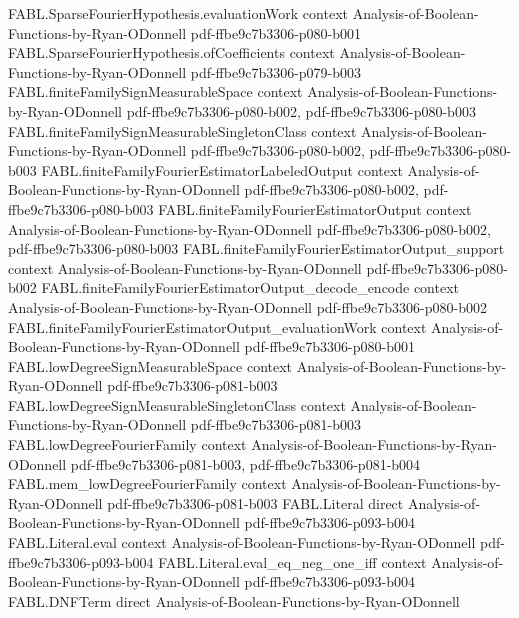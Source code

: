 \begin{theorem}
\proofstep
  {FABL.SparseFourierHypothesis.evaluationWork}
  {context}
  {Analysis-of-Boolean-Functions-by-Ryan-ODonnell}
  {pdf-ffbe9c7b3306-p080-b001}
\proofstep
  {FABL.SparseFourierHypothesis.ofCoefficients}
  {context}
  {Analysis-of-Boolean-Functions-by-Ryan-ODonnell}
  {pdf-ffbe9c7b3306-p079-b003}
\proofstep
  {FABL.finiteFamilySignMeasurableSpace}
  {context}
  {Analysis-of-Boolean-Functions-by-Ryan-ODonnell}
  {pdf-ffbe9c7b3306-p080-b002,
    pdf-ffbe9c7b3306-p080-b003}
\proofstep
  {FABL.finiteFamilySignMeasurableSingletonClass}
  {context}
  {Analysis-of-Boolean-Functions-by-Ryan-ODonnell}
  {pdf-ffbe9c7b3306-p080-b002,
    pdf-ffbe9c7b3306-p080-b003}
\proofstep
  {FABL.finiteFamilyFourierEstimatorLabeledOutput}
  {context}
  {Analysis-of-Boolean-Functions-by-Ryan-ODonnell}
  {pdf-ffbe9c7b3306-p080-b002,
    pdf-ffbe9c7b3306-p080-b003}
\proofstep
  {FABL.finiteFamilyFourierEstimatorOutput}
  {context}
  {Analysis-of-Boolean-Functions-by-Ryan-ODonnell}
  {pdf-ffbe9c7b3306-p080-b002,
    pdf-ffbe9c7b3306-p080-b003}
\proofstep
  {FABL.finiteFamilyFourierEstimatorOutput_support}
  {context}
  {Analysis-of-Boolean-Functions-by-Ryan-ODonnell}
  {pdf-ffbe9c7b3306-p080-b002}
\proofstep
  {FABL.finiteFamilyFourierEstimatorOutput_decode_encode}
  {context}
  {Analysis-of-Boolean-Functions-by-Ryan-ODonnell}
  {pdf-ffbe9c7b3306-p080-b002}
\proofstep
  {FABL.finiteFamilyFourierEstimatorOutput_evaluationWork}
  {context}
  {Analysis-of-Boolean-Functions-by-Ryan-ODonnell}
  {pdf-ffbe9c7b3306-p080-b001}
\proofstep
  {FABL.lowDegreeSignMeasurableSpace}
  {context}
  {Analysis-of-Boolean-Functions-by-Ryan-ODonnell}
  {pdf-ffbe9c7b3306-p081-b003}
\proofstep
  {FABL.lowDegreeSignMeasurableSingletonClass}
  {context}
  {Analysis-of-Boolean-Functions-by-Ryan-ODonnell}
  {pdf-ffbe9c7b3306-p081-b003}
\proofstep
  {FABL.lowDegreeFourierFamily}
  {context}
  {Analysis-of-Boolean-Functions-by-Ryan-ODonnell}
  {pdf-ffbe9c7b3306-p081-b003,
    pdf-ffbe9c7b3306-p081-b004}
\proofstep
  {FABL.mem_lowDegreeFourierFamily}
  {context}
  {Analysis-of-Boolean-Functions-by-Ryan-ODonnell}
  {pdf-ffbe9c7b3306-p081-b003}
\proofstep
  {FABL.Literal}
  {direct}
  {Analysis-of-Boolean-Functions-by-Ryan-ODonnell}
  {pdf-ffbe9c7b3306-p093-b004}
\proofstep
  {FABL.Literal.eval}
  {context}
  {Analysis-of-Boolean-Functions-by-Ryan-ODonnell}
  {pdf-ffbe9c7b3306-p093-b004}
\proofstep
  {FABL.Literal.eval_eq_neg_one_iff}
  {context}
  {Analysis-of-Boolean-Functions-by-Ryan-ODonnell}
  {pdf-ffbe9c7b3306-p093-b004}
\proofstep
  {FABL.DNFTerm}
  {direct}
  {Analysis-of-Boolean-Functions-by-Ryan-ODonnell}

\end{theorem}
